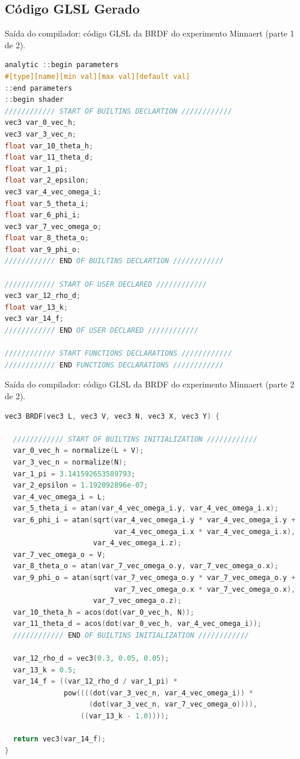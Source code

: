 \subsection{Código GLSL Gerado}
\begin{codigo}[H]
    \caption{\small Saída do compilador: código GLSL da BRDF do experimento Minnaert (parte 1 de 2).}
    \label{cod-minnaert-glsl-pt-1}
\begin{lstlisting}[language=C, inputencoding=utf8]
analytic ::begin parameters
#[type][name][min val][max val][default val]
::end parameters
::begin shader
//////////// START OF BUILTINS DECLARTION ////////////
vec3 var_0_vec_h;
vec3 var_3_vec_n;
float var_10_theta_h;
float var_11_theta_d;
float var_1_pi;
float var_2_epsilon;
vec3 var_4_vec_omega_i;
float var_5_theta_i;
float var_6_phi_i;
vec3 var_7_vec_omega_o;
float var_8_theta_o;
float var_9_phi_o;
//////////// END OF BUILTINS DECLARTION ////////////

//////////// START OF USER DECLARED ////////////
vec3 var_12_rho_d;
float var_13_k;
vec3 var_14_f;
//////////// END OF USER DECLARED ////////////

//////////// START FUNCTIONS DECLARATIONS ////////////
//////////// END FUNCTIONS DECLARATIONS ////////////
\end{lstlisting}
\end{codigo}

\begin{codigo}[H]
    \caption{\small Saída do compilador: código GLSL da BRDF do experimento Minnaert (parte 2 de 2).}
    \label{cod-minnaert-glsl-pt-2}
\begin{lstlisting}[language=C, inputencoding=utf8]
vec3 BRDF(vec3 L, vec3 V, vec3 N, vec3 X, vec3 Y) {

  //////////// START OF BUILTINS INITIALIZATION ////////////
  var_0_vec_h = normalize(L + V);
  var_3_vec_n = normalize(N);
  var_1_pi = 3.141592653589793;
  var_2_epsilon = 1.192092896e-07;
  var_4_vec_omega_i = L;
  var_5_theta_i = atan(var_4_vec_omega_i.y, var_4_vec_omega_i.x);
  var_6_phi_i = atan(sqrt(var_4_vec_omega_i.y * var_4_vec_omega_i.y +
                          var_4_vec_omega_i.x * var_4_vec_omega_i.x),
                     var_4_vec_omega_i.z);
  var_7_vec_omega_o = V;
  var_8_theta_o = atan(var_7_vec_omega_o.y, var_7_vec_omega_o.x);
  var_9_phi_o = atan(sqrt(var_7_vec_omega_o.y * var_7_vec_omega_o.y +
                          var_7_vec_omega_o.x * var_7_vec_omega_o.x),
                     var_7_vec_omega_o.z);
  var_10_theta_h = acos(dot(var_0_vec_h, N));
  var_11_theta_d = acos(dot(var_0_vec_h, var_4_vec_omega_i));
  //////////// END OF BUILTINS INITIALIZATION ////////////

  var_12_rho_d = vec3(0.3, 0.05, 0.05);
  var_13_k = 0.5;
  var_14_f = ((var_12_rho_d / var_1_pi) *
              pow((((dot(var_3_vec_n, var_4_vec_omega_i)) *
                    (dot(var_3_vec_n, var_7_vec_omega_o)))),
                  ((var_13_k - 1.0))));

  return vec3(var_14_f);
}
\end{lstlisting}
\end{codigo}
